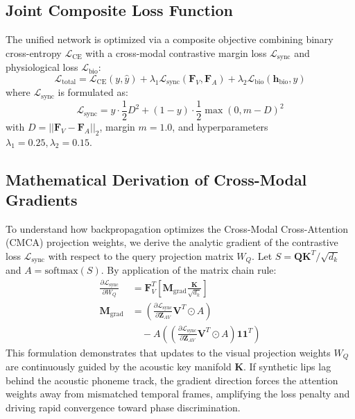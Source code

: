 \documentclass[journal]{IEEEtran}
\begin{document}
\subsection{Joint Composite Loss Function}
The unified network is optimized via a composite objective combining binary cross-entropy $\mathcal{L}_{\text{CE}}$ with a cross-modal contrastive margin loss $\mathcal{L}_{\text{sync}}$ and physiological loss $\mathcal{L}_{\text{bio}}$:
\begin{equation}
\mathcal{L}_{\text{total}} = \mathcal{L}_{\text{CE}}(y, \hat{y}) + \lambda_1 \mathcal{L}_{\text{sync}}(\mathbf{F}_V, \mathbf{F}_A) + \lambda_2 \mathcal{L}_{\text{bio}}(\mathbf{h}_{\text{bio}}, y)
\end{equation}
where $\mathcal{L}_{\text{sync}}$ is formulated as:
\begin{equation}
\mathcal{L}_{\text{sync}} = y \cdot \frac{1}{2} D^2 + (1 - y) \cdot \frac{1}{2} \max(0, m - D)^2
\end{equation}
with $D = ||\mathbf{F}_V - \mathbf{F}_A||_2$, margin $m = 1.0$, and hyperparameters $\lambda_1 = 0.25, \lambda_2 = 0.15$.

\subsection{Mathematical Derivation of Cross-Modal Gradients}
To understand how backpropagation optimizes the Cross-Modal Cross-Attention (CMCA) projection weights, we derive the analytic gradient of the contrastive loss $\mathcal{L}_{\text{sync}}$ with respect to the query projection matrix $W_Q$. Let $S = \mathbf{Q}\mathbf{K}^T / \sqrt{d_k}$ and $A = \text{softmax}(S)$. By application of the matrix chain rule:
\begin{align}
\frac{\partial \mathcal{L}_{\text{sync}}}{\partial W_Q} &= \mathbf{F}_V^T \left[ \mathbf{M}_{\text{grad}} \frac{\mathbf{K}}{\sqrt{d_k}} \right] \\
\mathbf{M}_{\text{grad}} &= \left( \frac{\partial \mathcal{L}_{\text{sync}}}{\partial \mathbf{Z}_{AV}} \mathbf{V}^T \odot A \right) \nonumber \\
&\quad - A \left( \left(\frac{\partial \mathcal{L}_{\text{sync}}}{\partial \mathbf{Z}_{AV}} \mathbf{V}^T \odot A\right) \mathbf{1} \mathbf{1}^T \right)
\end{align}
This formulation demonstrates that updates to the visual projection weights $W_Q$ are continuously guided by the acoustic key manifold $\mathbf{K}$. If synthetic lips lag behind the acoustic phoneme track, the gradient direction forces the attention weights away from mismatched temporal frames, amplifying the loss penalty and driving rapid convergence toward phase discrimination.
\end{document}
